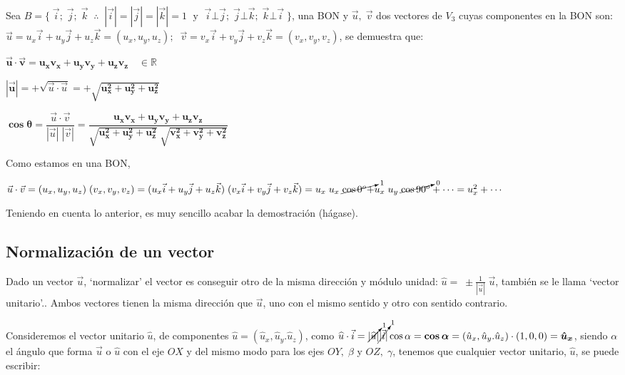 \begin{prop}
Sea $B=\{ \;  \vec i;\; \vec j;\; \vec k\; \; \therefore \;  \; |\vec i|=|\vec j|=|\vec k|=1 \; \text {  y  } \; \vec i \bot \vec j; \; \vec j \bot \vec k; \; \vec k \bot \vec i \; \}$, una BON y $\vec u,\; \vec v$ dos vectores de $V_3$ cuyas componentes en la BON son:  $\vec u=u_x\vec i+u_y\vec j+u_z\vec k=(u_x,u_y,u_z);\; \; \vec v=v_x\vec i+v_y\vec j+v_z\vec k=(v_x,v_y,v_z)$, se demuestra que:

$\boldsymbol{\vec u \cdot \vec v = u_xv_x+u_yv_y+u_zv_z} \quad \in \mathbb R$

$\boldsymbol{|\vec u|}= + \sqrt{\vec u \cdot \vec u}=\boldsymbol{+\sqrt{u_x^2+u_y^2+u_z^2}}$

$\boldsymbol{\cos \theta} = \dfrac {\vec u \cdot \vec v}{|\vec u|\; |\vec v|}= \boldsymbol{\dfrac {u_xv_x+u_yv_y+u_zv_z }{\sqrt{u_x^2+u_y^2+u_z^2}\; \sqrt{v_x^2+v_y^2+v_z^2}}}$
\end{prop}
\begin{proofw}
Como estamos en una BON, 

\noindent $\vec u \cdot \vec v =(u_x,u_y,u_z)\;(v_x,v_y,v_z)= (u_x\vec i+u_y\vec j+u_z\vec k)\; (v_x\vec i+v_y\vec j+v_z\vec k)= u_x\; u_x \; \cancelto{1}{\cos 0^o+} u_x\; u_y\; \cancelto{0}{\cos 90^o} + \cdots=u_x^2+\cdots $ 

\noindent Teniendo en cuenta lo anterior, es muy sencillo acabar la demostración (hágase).
	
\end{proofw}

\subsection{Normalización de un vector}

\begin{defi}
	Dado un vector $\vec u$, `normalizar' el vector es conseguir otro de la misma dirección y módulo unidad: $\widehat{u}=\; \pm \frac 1 {|\vec u|}\; \vec u$, también se le llama `vector unitario'.. Ambos vectores tienen la misma dirección que $\vec u$, uno con el mismo sentido y otro con sentido contrario.
\end{defi}

Consideremos el vector unitario $\widehat u$, de componentes $\widehat u=(\hat u_x,\hat u_y.\hat u_z)$, como $\widehat u \cdot \vec i=\cancelto{1}{|\widehat u|}\cancelto{1}{|\vec i|}\cos \alpha=\boldsymbol{ \cos \alpha}=(\hat u_x,\hat u_y.\hat u_z)\cdot(1,0,0)=\boldsymbol{\hat u_x}$, siendo $\alpha$ el ángulo que forma $\vec u$ o $\widehat u$ con el eje $OX$ y del mismo modo para los ejes $OY,\; \beta$ y $OZ,\; \gamma$, tenemos que cualquier vector unitario, $\widehat u$, se puede escribir:

